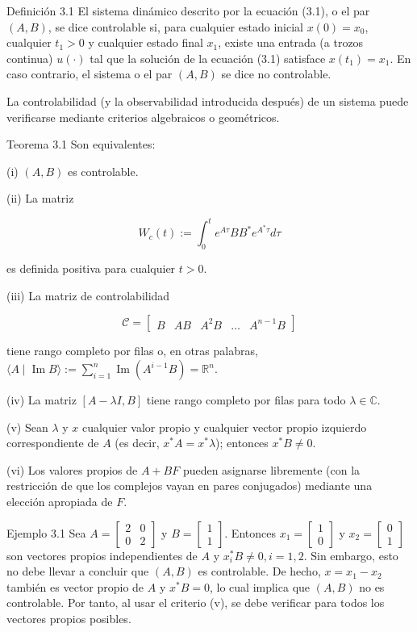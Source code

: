 Definición 3.1 El sistema dinámico descrito por la ecuación (3.1), o el par $(A, B)$, se dice controlable si, para cualquier estado inicial $x(0)=x_{0}$, cualquier $t_{1}>0$ y cualquier estado final $x_{1}$, existe una entrada (a trozos continua) $u(\cdot)$ tal que la solución de la ecuación (3.1) satisface $x\left(t_{1}\right)=x_{1}$. En caso contrario, el sistema o el par $(A, B)$ se dice no controlable.

La controlabilidad (y la observabilidad introducida después) de un sistema puede verificarse mediante criterios algebraicos o geométricos.

Teorema 3.1 Son equivalentes:

(i) $(A, B)$ es controlable.

(ii) La matriz

$$
W_{c}(t):=\int_{0}^{t} e^{A \tau} B B^{*} e^{A^{*} \tau} d \tau
$$

es definida positiva para cualquier $t>0$.

(iii) La matriz de controlabilidad

$$
\mathcal{C}=\left[\begin{array}{lllll}
B & A B & A^{2} B & \ldots & A^{n-1} B
\end{array}\right]
$$

tiene rango completo por filas o, en otras palabras, $\langle A \mid \operatorname{Im} B\rangle:=\sum_{i=1}^{n} \operatorname{Im}\left(A^{i-1} B\right)=\mathbb{R}^{n}$.

(iv) La matriz $[A-\lambda I, B]$ tiene rango completo por filas para todo $\lambda \in \mathbb{C}$.

(v) Sean $\lambda$ y $x$ cualquier valor propio y cualquier vector propio izquierdo correspondiente de $A$ (es decir, $x^{*} A=x^{*} \lambda$); entonces $x^{*} B \neq 0$.

(vi) Los valores propios de $A+B F$ pueden asignarse libremente (con la restricción de que los complejos vayan en pares conjugados) mediante una elección apropiada de $F$.

Ejemplo 3.1 Sea $A=\left[\begin{array}{ll}2 & 0 \\ 0 & 2\end{array}\right]$ y $B=\left[\begin{array}{l}1 \\ 1\end{array}\right]$. Entonces $x_{1}=\left[\begin{array}{l}1 \\ 0\end{array}\right]$ y $x_{2}=\left[\begin{array}{l}0 \\ 1\end{array}\right]$ son vectores propios independientes de $A$ y $x_{i}^{*} B \neq 0, i=1,2$. Sin embargo, esto no debe llevar a concluir que $(A, B)$ es controlable. De hecho, $x=x_{1}-x_{2}$ también es vector propio de $A$ y $x^{*} B=0$, lo cual implica que $(A, B)$ no es controlable. Por tanto, al usar el criterio (v), se debe verificar para todos los vectores propios posibles.

